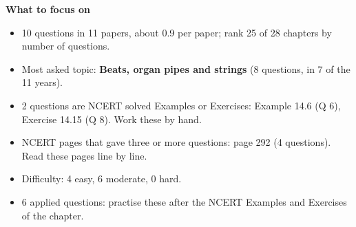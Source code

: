 \begin{minipage}[t]{0.63\linewidth}{\small\textbf{\color{crimson}What to focus on}\par\smallskip
\begin{itemize}[leftmargin=1.1em,itemsep=1pt,topsep=0pt]
\item 10 questions in 11 papers, about 0.9 per paper; rank 25 of 28 chapters by number of questions.
\item Most asked topic: \textbf{Beats, organ pipes and strings} (8 questions, in 7 of the 11 years).
\item 2 questions are NCERT solved Examples or Exercises: Example 14.6 (Q 6), Exercise 14.15 (Q 8). Work these by hand.
\item NCERT pages that gave three or more questions: page 292 (4 questions). Read these pages line by line.
\item Difficulty: 4 easy, 6 moderate, 0 hard.
\item 6 applied questions: practise these after the NCERT Examples and Exercises of the chapter.
\end{itemize}}\end{minipage}\par
{}
